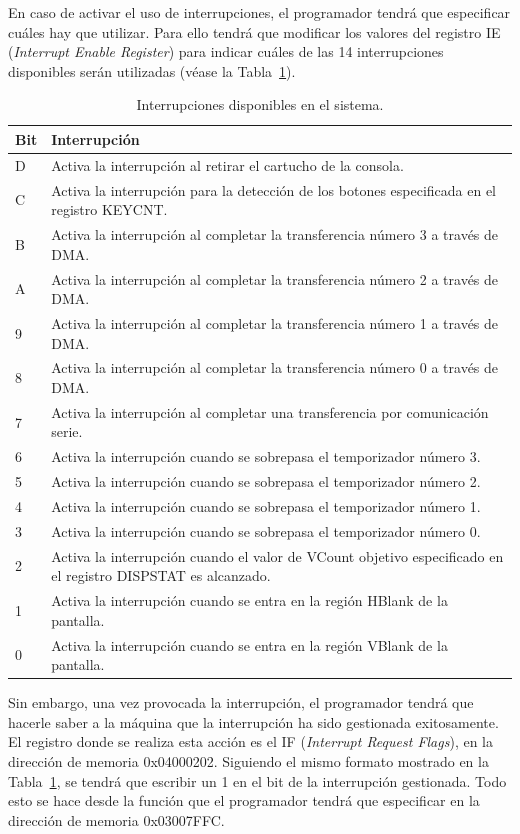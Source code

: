 En caso de activar el uso de interrupciones, el programador tendrá que especificar cuáles hay que utilizar. Para ello tendrá que modificar los valores del registro IE (\textit{Interrupt Enable Register}) para indicar cuáles de las 14 interrupciones disponibles serán utilizadas (véase la Tabla~\ref{tab:irq_ie}).

\begin{table}[h]
	\centering
	\begin{tabular}{| l | p{15cm} |}
		\hline
		\textbf{Bit} & \textbf{Interrupción} \\ \hline
		D &  Activa la interrupción al retirar el cartucho de la consola. \\ \hline
		C &  Activa la interrupción para la detección de los botones especificada en el registro KEYCNT. \\ \hline
		B &  Activa la interrupción al completar la transferencia número 3 a través de DMA. \\ \hline
		A &  Activa la interrupción al completar la transferencia número 2 a través de DMA. \\ \hline
		9 &  Activa la interrupción al completar la transferencia número 1 a través de DMA. \\ \hline
		8 &  Activa la interrupción al completar la transferencia número 0 a través de DMA. \\ \hline
		7 &  Activa la interrupción al completar una transferencia por comunicación serie. \\ \hline
		6 &  Activa la interrupción cuando se sobrepasa el temporizador número 3. \\ \hline
		5 &  Activa la interrupción cuando se sobrepasa el temporizador número 2. \\ \hline
		4 &  Activa la interrupción cuando se sobrepasa el temporizador número 1. \\ \hline
		3 &  Activa la interrupción cuando se sobrepasa el temporizador número 0. \\ \hline
		2 &  Activa la interrupción cuando el valor de VCount objetivo especificado en el registro DISPSTAT es alcanzado. \\ \hline
		1 &  Activa la interrupción cuando se entra en la región HBlank de la pantalla. \\ \hline
		0 &  Activa la interrupción cuando se entra en la región VBlank de la pantalla. \\ \hline
	\end{tabular}
	\caption{Interrupciones disponibles en el sistema.}\label{tab:irq_ie}
\end{table}

Sin embargo, una vez provocada la interrupción, el programador tendrá que hacerle saber a la máquina que la interrupción ha sido gestionada exitosamente. El registro donde se realiza esta acción es el IF (\textit{Interrupt Request Flags}), en la dirección de memoria 0x04000202. Siguiendo el mismo formato mostrado en la Tabla~\ref{tab:irq_ie}, se tendrá que escribir un 1 en el bit de la interrupción gestionada. Todo esto se hace desde la función que el programador tendrá que especificar en la dirección de memoria 0x03007FFC.
